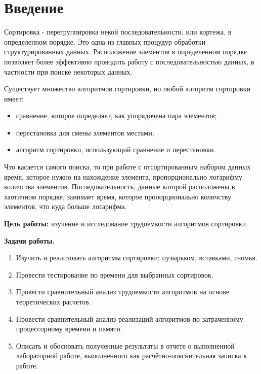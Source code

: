 \chapter*{Введение}

Сортировка - перегруппировка некой последовательности, или кортежа, в определенном порядке. Это одна из главных процудур обработки структурированных данных. Расположение элементов в определенном порядке позволяет более эффективно проводить работу с последовательностью данных, в частности при поиске некоторых данных. \newline

Существует множество алгоритмов сортировки, но любой алгоритм сортировки имеет:
\begin{itemize}
	\item сравнение, которое определяет, как упорядочена пара элементов;
    \item перестановка для смены элементов местами;
    \item алгоритм сортировки, использующий сравнение и перестановки. \newline
\end{itemize}

Что касается самого поиска, то при работе с отсортированным набором данных время, которое нужно на нахождение элемента, пропорционально логарифму количства элементов. Последовательность, данные которой расположены в хаотичном порядке, занимает время, которое пропорционально количству элементов, что куда больше логарифма. \newline

\textbf{Цель работы:} изучение и исследование трудоемкости алгоритмов сортировки. \newline

\textbf{Задачи работы.}
\begin{enumerate}
	\item Изучить и реализовать алгоритмы сортировки: пузырьком, вставками, гномья.
    \item Провести тестирование по времени для выбранных сортировок.
    \item Провести сравнительный анализ трудоемкости алгоритмов на основе теоретических расчетов.
    \item Провести сравнительный анализ реализаций алгоритмов по затраченному процессорному времени и памяти.
	\item Описать и обосновать полученные результаты в отчете о выполненной лабораторной работе, выполненного как расчётно-пояснительная записка к работе.
\end{enumerate}